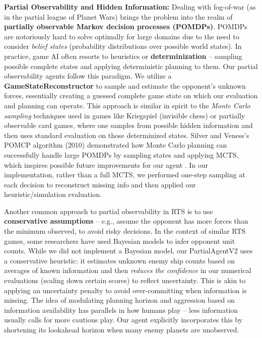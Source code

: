 \documentclass[conference]{IEEEtran}
\begin{document}
\textbf{Partial Observability and Hidden Information:} Dealing with fog-of-war (as in the partial league of Planet Wars) brings the problem into the realm of \textbf{partially observable Markov decision processes (POMDPs)}. POMDPs are notoriously hard to solve optimally for large domains due to the need to consider \textit{belief states} (probability distributions over possible world states). In practice, game AI often resorts to heuristics or \textbf{determinization} -- sampling possible complete states and applying deterministic planning to them. Our partial observability agents follow this paradigm. We utilize a \textbf{GameStateReconstructor} to sample and estimate the opponent's unknown forces, essentially creating a guessed complete game state on which our evaluation and planning can operate. This approach is similar in spirit to the \textit{Monte Carlo sampling} techniques used in games like Kriegspiel (invisible chess) or partially observable card games, where one samples from possible hidden information and then uses standard evaluation on those determinized states. Silver and Veness's POMCP algorithm (2010) \cite{silver2010} demonstrated how Monte Carlo planning can successfully handle large POMDPs by sampling states and applying MCTS, which inspires possible future improvements for our agent \cite{silver2010}. In our implementation, rather than a full MCTS, we performed one-step sampling at each decision to reconstruct missing info and then applied our heuristic/simulation evaluation.

Another common approach to partial observability in RTS is to use \textbf{conservative assumptions} -- e.g., assume the opponent has more forces than the minimum observed, to avoid risky decisions. In the context of similar RTS games, some researchers have used Bayesian models to infer opponent unit counts. While we did not implement a Bayesian model, our PartialAgentV2 uses a conservative heuristic: it estimates unknown enemy ship counts based on averages of known information and then \textit{reduces the confidence} in our numerical evaluations (scaling down certain scores) to reflect uncertainty. This is akin to applying an uncertainty penalty to avoid over-committing when information is missing. The idea of modulating planning horizon and aggression based on information availability has parallels in how humans play -- less information usually calls for more cautious play. Our agent explicitly incorporates this by shortening its lookahead horizon when many enemy planets are unobserved.
\end{document}
